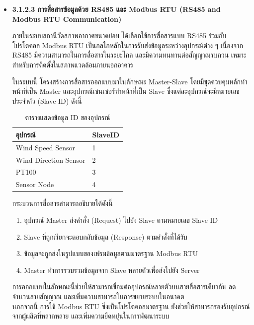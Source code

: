 \begin{itemize}
    \newpage
    \item [] \textbf{3.1.2.3 การสื่อสารข้อมูลด้วย RS485 และ Modbus RTU (RS485 and Modbus RTU Communication)} 
    
    \hspace{\parindent} ภายในระบบสถานีวัดสภาพอากาศขนาดย่อม ได้เลือกใช้การสื่อสารแบบ RS485 ร่วมกับโปรโตคอล Modbus RTU เป็นกลไกหลักในการรับส่งข้อมูลระหว่างอุปกรณ์ต่าง ๆ เนื่องจาก RS485 มีความสามารถในการสื่อสารในระยะไกล และมีความทนทานต่อสัญญาณรบกวน เหมาะสำหรับการติดตั้งในสภาพแวดล้อมภายนอกอาคาร
    
    \hspace{\parindent} ในระบบนี้ โครงสร้างการสื่อสารออกแบบมาในลักษณะ Master-Slave โดยมีชุดควบคุมหลักทำหน้าที่เป็น Master และอุปกรณ์เซนเซอร์ทำหน้าที่เป็น Slave ซึ่งแต่ละอุปกรณ์จะมีหมายเลขประจำตัว (Slave ID) ดังนี้
    
    \begin{table}[h]
    \centering
    \begin{tabular}{|l|l|}
    \hline
    \textbf{อุปกรณ์} & \textbf{SlaveID} \\ \hline
    Wind Speed Sensor & 1 \\ \hline
    Wind Direction Sensor & 2 \\ \hline
    PT100 & 3 \\ \hline
    Sensor Node & 4 \\ \hline
    \end{tabular}
    \caption{ตารางแสดงข้อมูล ID ของอุปกรณ์}
    \end{table}

    กระบวนการสื่อสารสามารถอธิบายได้ดังนี้
    \begin{enumerate}
        \item อุปกรณ์ Master ส่งคำสั่ง (Request) ไปยัง Slave ตามหมายเลข Slave ID
        \item Slave ที่ถูกเรียกจะตอบกลับข้อมูล (Response) ตามคำสั่งที่ได้รับ
        \item ข้อมูลจะถูกส่งในรูปแบบของเฟรมข้อมูลตามมาตรฐาน Modbus RTU
        \item Master ทำการรวบรวมข้อมูลจาก Slave หลายตัวเพื่อส่งไปยัง Server
    \end{enumerate}

    \hspace{\parindent} การออกแบบในลักษณะนี้ช่วยให้สามารถเชื่อมต่ออุปกรณ์หลายตัวบนสายสื่อสารเดียวกัน ลดจำนวนสายสัญญาณ และเพิ่มความสามารถในการขยายระบบในอนาคต \\
    \hspace{\parindent} นอกจากนี้ การใช้ Modbus RTU ซึ่งเป็นโปรโตคอลมาตรฐาน ยังช่วยให้สามารถรองรับอุปกรณ์จากผู้ผลิตที่หลากหลาย และเพิ่มความยืดหยุ่นในการพัฒนาระบบ

\end{itemize}

